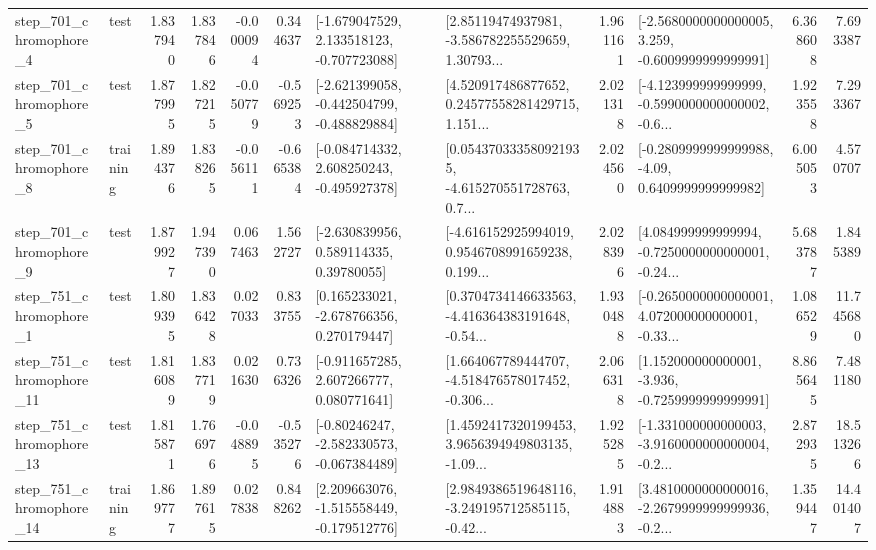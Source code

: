 \begin{tabular}{llrrrrllrlrr}
   step\_701\_chromophore\_4 &      test &      1.837940 &    1.837846 &     -0.000094 &  0.344637 &   [-1.679047529, 2.133518123, -0.707723088] &  [2.85119474937981, -3.586782255529659, 1.30793... &       1.961161 &  [-2.5680000000000005, 3.259, -0.6009999999999991] &            6.368608 &          7.693387 \\
   step\_701\_chromophore\_5 &      test &      1.877995 &    1.827215 &     -0.050779 & -0.569253 &  [-2.621399058, -0.442504799, -0.488829884] &  [4.520917486877652, 0.24577558281429715, 1.151... &       2.021318 &  [-4.123999999999999, -0.5990000000000002, -0.6... &            1.923558 &          7.293367 \\
   step\_701\_chromophore\_8 &  training &      1.894376 &    1.838265 &     -0.056111 & -0.665384 &   [-0.084714332, 2.608250243, -0.495927378] &  [0.054370333580921935, -4.615270551728763, 0.7... &       2.024560 &   [-0.2809999999999988, -4.09, 0.6409999999999982] &            6.005053 &          4.570707 \\
   step\_701\_chromophore\_9 &      test &      1.879927 &    1.947390 &      0.067463 &  1.562727 &     [-2.630839956, 0.589114335, 0.39780055] &  [-4.616152925994019, 0.9546708991659238, 0.199... &       2.028396 &  [4.084999999999994, -0.7250000000000001, -0.24... &            5.683787 &          1.845389 \\
   step\_751\_chromophore\_1 &      test &      1.809395 &    1.836428 &      0.027033 &  0.833755 &    [0.165233021, -2.678766356, 0.270179447] &  [0.3704734146633563, -4.416364383191648, -0.54... &       1.930488 &  [-0.2650000000000001, 4.072000000000001, -0.33... &            1.086529 &         11.745680 \\
  step\_751\_chromophore\_11 &      test &      1.816089 &    1.837719 &      0.021630 &  0.736326 &    [-0.911657285, 2.607266777, 0.080771641] &  [1.664067789444707, -4.518476578017452, -0.306... &       2.066318 &   [1.152000000000001, -3.936, -0.7259999999999991] &            8.865645 &          7.481180 \\
  step\_751\_chromophore\_13 &      test &      1.815871 &    1.766976 &     -0.048895 & -0.535276 &   [-0.80246247, -2.582330573, -0.067384489] &  [1.4592417320199453, 3.9656394949803135, -1.09... &       1.925285 &  [-1.331000000000003, -3.9160000000000004, -0.2... &            2.872935 &         18.513266 \\
  step\_751\_chromophore\_14 &  training &      1.869777 &    1.897615 &      0.027838 &  0.848262 &   [2.209663076, -1.515558449, -0.179512776] &  [2.9849386519648116, -3.249195712585115, -0.42... &       1.914883 &  [3.4810000000000016, -2.2679999999999936, -0.2... &            1.359447 &         14.401407 \\

\end{tabular}
